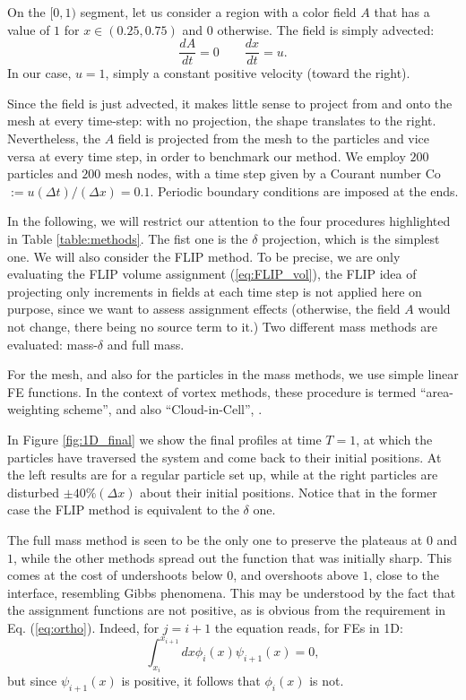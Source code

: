 \documentclass{ws-ijcm}
\begin{document}
On the $[0,1)$ segment, let us consider a region with a color field
$A$ that has a value of $1$ for $x \in (0.25,0.75)$ and $0$
otherwise. The field is simply advected:
\begin{equation}
  \frac{d A}{d t} = 0 \qquad   \frac{d x}{d t} = u .
\end{equation}
In our case, $u = 1$, simply a constant positive velocity (toward the
right).

Since the field is just advected, it makes little sense to project
from and onto the mesh at every time-step: with no projection, the
shape translates to the right. Nevertheless, the $A$ field is
projected from the mesh to the particles and vice versa at every time
step, in order to benchmark our method. We employ $200$ particles and
$200$ mesh nodes, with a time step given by a Courant number
Co$:= u (\Delta t) / (\Delta x) = 0.1 $. Periodic boundary conditions
are imposed at the ends.

In the following, we will restrict our attention to the four
procedures highlighted in Table \ref{table:methods}.  The fist one is
the $\delta$ projection, which is the simplest one. We will also
consider the FLIP method. To be precise, we are only evaluating the
FLIP volume assignment (\ref{eq:FLIP_vol}), the FLIP idea of
projecting only increments in fields at each time step is not applied
here on purpose, since we want to assess assignment effects
(otherwise, the field $A$ would not change, there being no source term
to it.) Two different mass methods are evaluated: mass-$\delta$ and
full mass.

For the mesh, and also for the particles in the mass methods, we use
simple linear FE functions. In the context of vortex methods, these
procedure is termed ``area-weighting scheme'', and also
``Cloud-in-Cell'', \cite{christiansen1973}.

In Figure \ref{fig:1D_final} we show the final profiles at time $T=1$,
at which the particles have traversed the system and come back to
their initial positions. At the left results are for a regular
particle set up, while at the right particles are disturbed
$\pm 40\% (\Delta x)$ about their initial positions. Notice that in
the former case the FLIP method is equivalent to the $\delta$ one.

The full mass method is seen to be the only one to preserve the
plateaus at $0$ and $1$, while the other methods spread out the
function that was initially sharp. This comes at the cost of
undershoots below $0$, and overshoots above $1$, close to the
interface, resembling Gibbs phenomena.  This may be understood by
the fact that the assignment functions are not positive, as is obvious
from the requirement in Eq. (\ref{eq:ortho}). Indeed, for $j=i+1$ the
equation reads, for FEs in 1D:
\[
\int_{x_i}^{x_{i+1}} dx \phi_i(x) \psi_{i+1}(x) = 0,
\]
but since $\psi_{i+1}(x)$ is positive, it follows that $\phi_i(x)$ is
not.
\end{document}
